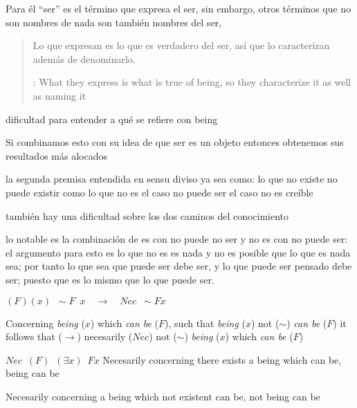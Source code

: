 Para él ``ser'' es el término que expresa el ser, sin embargo, otros términos que no son nombres de nada son también nombres del ser, \blockquote[{\cite[x]{anscombe1981parmenides}}: What they express is what is true of being, so they characterize it as well as naming it]{Lo que expresan es lo que es verdadero del ser, así que lo caracterizan además de denominarlo.}

dificultad para entender a qué se refiere con being

Si combinamos esto con su idea de que ser es un objeto entonces obtenemos sus resultados más alocados

la segunda premisa entendida en sensu diviso ya sea como: lo que no existe no puede existir como lo que no es el caso no puede ser el caso no es creíble


también hay una dificultad sobre los dos caminos del conocimiento

lo notable es la combinación de es con no puede no ser y no es con no puede ser: el argumento para esto es lo que no es es nada y no es posible que lo que es nada sea; por tanto lo que sea que puede ser debe ser, y lo que puede ser pensado debe ser; puesto que es lo mismo que lo que puede ser.

  $(F)(x)\enspace {\sim}F\enspace x\quad \longrightarrow\quad Nec\enspace
  {\sim}Fx$

  Concerning \emph{being} ($x$) which \emph{can be} ($F$), such that
  \emph{being} ($x$) not (${\sim}$) \emph{can be} ($F$) it follows that
  ($\longrightarrow$) necesarily ($Nec$) not (${\sim}$) \emph{being} ($x$) which
  \emph{can be} ($F$)

  $Nec\enspace (F)\enspace (\exists x)\enspace Fx$
  Necesarily concerning there exists a being which can be, being can be

  Necesarily concerning a being which not existent can be, not being can be


